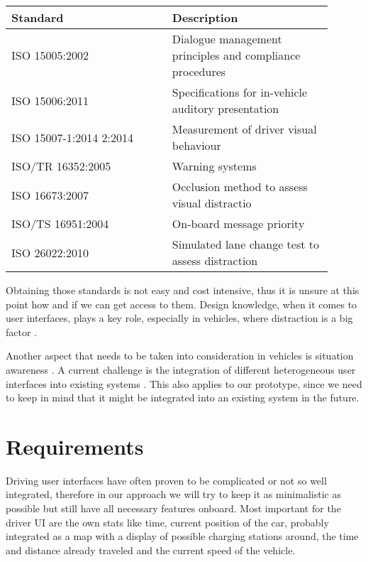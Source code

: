 \documentclass[hidelinks]{sig-alternate}
\begin{document}
\vspace{3mm}
\noindent
\def\arraystretch{1.5}
\begin{tabular}{p{0.45\linewidth} | p{0.45\linewidth}}
\rowcolor{Gray!25}
\textbf{Standard} & \textbf{Description} \\\hline
ISO 15005:2002 & Dialogue management principles and compliance procedures \\\hline
ISO 15006:2011 & Specifications for in-vehicle auditory presentation \\\hline
ISO 15007-1:2014 2:2014 & Measurement of driver visual behaviour \\\hline
ISO/TR 16352:2005 & Warning systems \\\hline
ISO 16673:2007 & Occlusion method to assess visual distractio \\\hline
ISO/TS 16951:2004 & On-board message priority \\\hline
ISO 26022:2010 & Simulated lane change test to assess distraction
\end{tabular}
\vspace{2mm}

Obtaining those standards is not easy and cost intensive, thus it is unsure at this point how and if we can get
access to them. Design knowledge, when it comes to user interfaces, plays a key role, especially in vehicles, where
distraction is a big factor \cite{Developmentofanautomotiveuserinterfacedesignknowledgesystem}.

Another aspect that needs to be taken into consideration in vehicles is situation awareness \cite{Skrypchuk2016}. A
current challenge is the integration of different heterogeneous user interfaces into existing systems
\cite{Holstein2015}. This also applies to our prototype, since we need to keep in mind that it might be integrated
into an existing system in the future.


\section{Requirements}

Driving user interfaces have often proven to be complicated or not so well integrated, therefore in our approach we
will try to keep it as minimalistic as possible but still have all necessary features onboard. Most important for the
driver UI are the own stats like time, current position of the car, probably integrated as a map with a display of
possible charging stations around, the time and distance already traveled and the current speed of the vehicle.
\end{document}
